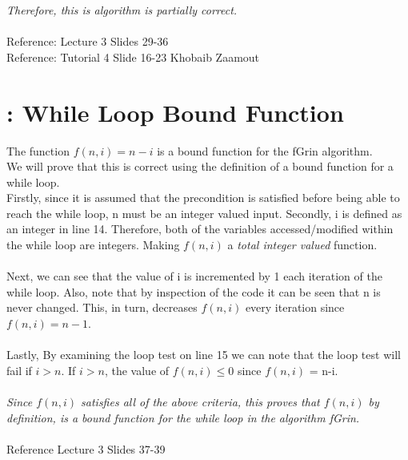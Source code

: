 \documentclass{article}
\begin{document}
    \textit{Therefore, this is algorithm is partially correct.}
    \\
    \\ Reference: Lecture 3 Slides 29-36
    \\ Reference: Tutorial 4 Slide 16-23 Khobaib Zaamout
    \\
    \section{: While Loop Bound Function}
    The function $f(n, i) = n-i$ is a bound function for the fGrin algorithm.\\
    We will prove that this is correct using the definition of a bound function for a while loop.
    \\Firstly, since it is assumed that the precondition is satisfied before being able to reach the while loop, n must be an integer valued input. Secondly, i is defined as an integer in line 14. Therefore, both of the variables accessed/modified within the while loop are integers. Making $f(n,i)$ a \textit{total integer valued} function.\\
    \\Next, we can see that the value of i is incremented by 1 each iteration of the while loop. Also, note that by inspection of the code it can be seen that n is never changed. This, in turn, decreases $f(n, i)$ every iteration since $f(n, i)=n-1$.\\
    \\Lastly, By examining the loop test on line 15 we can note that the loop test will fail if $i>n$. If $i>n$, the value of $f(n,i) \leq 0$ since $f(n,i)$ = n-i. \\
    \\\textit{Since $f(n,i)$ satisfies all of the above criteria, this proves that $f(n,i)$ by definition, is a bound function for the while loop in the algorithm fGrin.}
    \\
    \\Reference Lecture 3 Slides 37-39
\end{document}
